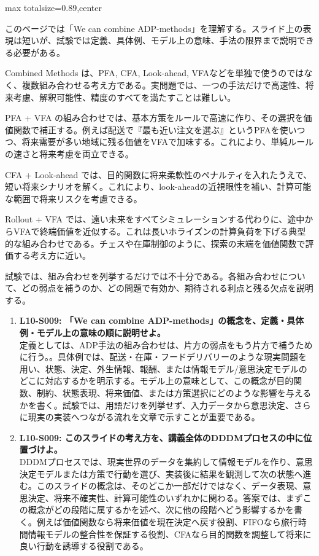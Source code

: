 \begin{minipage}[t]{0.58\textwidth}
\begin{adjustbox}{max totalsize={\textwidth}{0.89\textheight},center}
\begin{minipage}{\textwidth}\scriptsize
{}このページでは「We can combine ADP-methods」を理解する。スライド上の表現は短いが、試験では定義、具体例、モデル上の意味、手法の限界まで説明できる必要がある。\par
Combined Methods は、PFA, CFA, Look-ahead, VFAなどを単独で使うのではなく、複数組み合わせる考え方である。実問題では、一つの手法だけで高速性、将来考慮、解釈可能性、精度のすべてを満たすことは難しい。\par
PFA + VFA の組み合わせでは、基本方策をルールで高速に作り、その選択を価値関数で補正する。例えば配送で『最も近い注文を選ぶ』というPFAを使いつつ、将来需要が多い地域に残る価値をVFAで加味する。これにより、単純ルールの速さと将来考慮を両立できる。\par
CFA + Look-ahead では、目的関数に将来柔軟性のペナルティを入れたうえで、短い将来シナリオを解く。これにより、look-aheadの近視眼性を補い、計算可能な範囲で将来リスクを考慮できる。\par
Rollout + VFA では、遠い未来をすべてシミュレーションする代わりに、途中からVFAで終端価値を近似する。これは長いホライズンの計算負荷を下げる典型的な組み合わせである。チェスや在庫制御のように、探索の末端を価値関数で評価する考え方に近い。\par
試験では、組み合わせを列挙するだけでは不十分である。各組み合わせについて、どの弱点を補うのか、どの問題で有効か、期待される利点と残る欠点を説明する。\par{}\begin{enumerate}\item \textbf{L10-S009: 「We can combine ADP-methods」の概念を、定義・具体例・モデル上の意味の順に説明せよ。}\\定義としては、ADP手法の組み合わせは、片方の弱点をもう片方で補うために行う。。具体例では、配送・在庫・フードデリバリーのような現実問題を用い、状態、決定、外生情報、報酬、または情報モデル/意思決定モデルのどこに対応するかを明示する。モデル上の意味として、この概念が目的関数、制約、状態表現、将来価値、または方策選択にどのような影響を与えるかを書く。試験では、用語だけを列挙せず、入力データから意思決定、さらに現実の実装へつながる流れを文章で示すことが重要である。\item \textbf{L10-S009: このスライドの考え方を、講義全体のDDDMプロセスの中に位置づけよ。}\\DDDMプロセスでは、現実世界のデータを集約して情報モデルを作り、意思決定モデルまたは方策で行動を選び、実装後に結果を観測して次の状態へ進む。このスライドの概念は、そのどこか一部だけではなく、データ表現、意思決定、将来不確実性、計算可能性のいずれかに関わる。答案では、まずこの概念がどの段階に属するかを述べ、次に他の段階へどう影響するかを書く。例えば価値関数なら将来価値を現在決定へ戻す役割、FIFOなら旅行時間情報モデルの整合性を保証する役割、CFAなら目的関数を調整して将来に良い行動を誘導する役割である。\end{enumerate}
\end{minipage}
\end{adjustbox}
\end{minipage}


